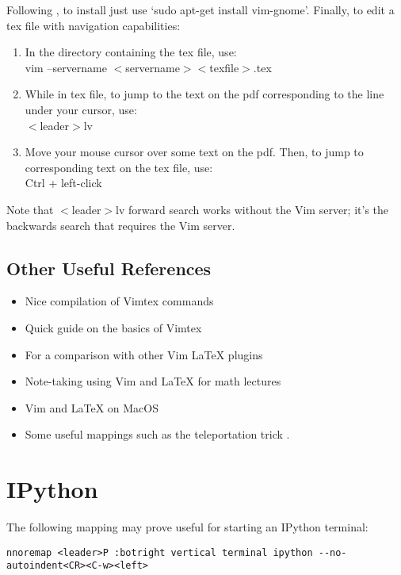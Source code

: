 \documentclass[10pt]{article}
\newcommand{\tlangle}{$<$}
\newcommand{\trangle}{$>$}
\begin{document}
Following \cite{lerner2004enable}, to install just use `sudo apt-get install
vim-gnome'. Finally, to edit a tex file with navigation capabilities:
\begin{enumerate}
    \item In the directory containing the tex file, use:\\
        vim --servername \tlangle servername\trangle \tlangle texfile\trangle.tex
    \item While in tex file, to jump to the text on the pdf corresponding to the
        line under your cursor, use:\\ 
        \tlangle leader\trangle lv
    \item Move your mouse cursor over some text on the pdf. Then, to jump to
        corresponding text on the tex file, use:\\ 
        Ctrl + left-click
\end{enumerate}
Note that \tlangle leader\trangle lv forward search works without the Vim
server; it's the backwards search that requires the Vim server.

\subsection{Other Useful References}
\begin{itemize}
    \item Nice compilation of Vimtex commands \cite{gunther2014vimtex}
    \item Quick guide on the basics of Vimtex \cite{jdhao2019complete}
    \item For a comparison with other Vim LaTeX plugins \cite{lervag2015vim}
    \item Note-taking using Vim and LaTeX for math lectures \cite{castel2019how}
    \item Vim and LaTeX on MacOS \cite{dyke2020getting}
    \item Some useful mappings such as the teleportation trick \cite{smith2016my, smith2017start}. 
\end{itemize}

\section{IPython}
The following mapping may prove useful for starting an IPython terminal:\\ 
\begin{lstlisting}
nnoremap <leader>P :botright vertical terminal ipython --no-autoindent<CR><C-w><left>
\end{lstlisting}
\end{document}
